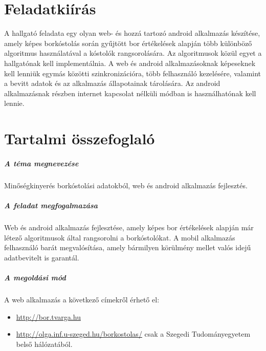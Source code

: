 \documentclass[12pt]{report}
\theoremstyle{definition}
\begin{document}
	\chapter*{Feladatkiírás}
	A hallgató feladata egy olyan web- és hozzá tartozó android alkalmazás készítése, amely képes borkóstolás során gyűjtött bor értékelések alapján több különböző algoritmus használatával a kóstolók rangsorolására. Az algoritmusok közül egyet a hallgatónak kell implementálnia. A web és android alkalmazásoknak képeseknek kell lenniük egymás közötti szinkronizációra, több felhasználó kezelésére, valamint a bevitt adatok és az alkalmazás állapotainak tárolására. Az android alkalmazásnak részben internet kapcsolat nélküli módban is használhatónak kell lennie.
	
	\chapter*{Tartalmi összefoglaló}
	
	\paragraph{A téma megnevezése}
	Minőségkinyerés borkóstolási adatokból, web és android alkalmazás fejlesztés.
	
	\paragraph{A feladat megfogalmazása}
	Web és android alkalmazás fejlesztése, amely képes bor értékelések alapján már létező algoritmusok által rangsorolni a borkóstolókat. A mobil alkalmazás felhasználó barát megvalósítása, amely bármilyen körülmény mellet valós idejű adatbevitelt is garantál.
	
	\paragraph{A megoldási mód}
	A web alkalmazás a következő címekről érhető el:
	\begin{itemize}
		\item \url{http://bor.tvarga.hu}
		\item \url{http://olga.inf.u-szeged.hu/borkostolas/} csak a Szegedi Tudományegyetem belső hálózatából.
	\end{itemize}
	
\end{document}
